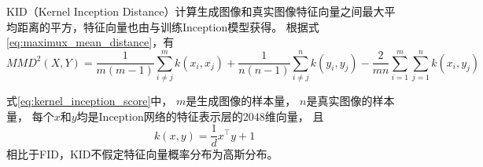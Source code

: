 KID{ {\cite{binkowski2018demystifying}}}（Kernel Inception Distance）计算生成图像和真实图像特征向量之间最大平均距离的平方，特征向量也由与训练Inception模型获得。
根据式{\ref{eq:maximux_mean_distance}}，有
\begin{equation}
    \label{eq:kernel_inception_score}
    MMD^{2}(X,Y)
    =\frac{1}{m(m-1)}\sum_{i \neq j }^{m}k(x_i,x_j) 
    +\frac{1}{n(n-1)}\sum_{i\neq j}^{n}k(y_i,y_j)
    -\frac{2}{mn}\sum_{i=1}^{m}\sum_{j=1}^{n}k(x_i,y_j)
\end{equation}

式{\ref{eq:kernel_inception_score}}中，
{$m$}是生成图像的样本量，
{$n$}是真实图像的样本量，
每个{$x$}和{$y$}均是Inception网络的特征表示层的2048维向量，
且
\begin{equation}
    k(x,y)=  \frac{1}{d}x^{\intercal  } y+1
\end{equation}
相比于FID，KID不假定特征向量概率分布为高斯分布{ {\cite{betzalel2022study}}}。



